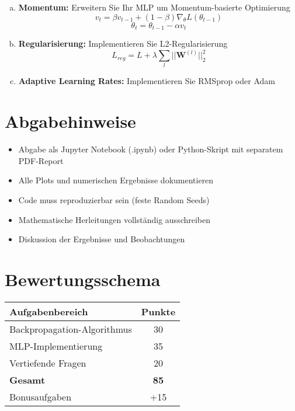 ﻿\documentclass[12pt,a4paper]{article}
\begin{document}
\begin{enumerate}[(a)]
    \item \textbf{Momentum:} Erweitern Sie Ihr MLP um Momentum-basierte Optimierung 
    \begin{equation}
    v_t = \beta v_{t-1} + (1-\beta) \nabla_\theta L(\theta_{t-1})
    \end{equation}
    \begin{equation}
    \theta_t = \theta_{t-1} - \alpha v_t
    \end{equation}
    
    \item \textbf{Regularisierung:} Implementieren Sie L2-Regularisierung 
    \begin{equation}
    L_{reg} = L + \lambda \sum_{l} ||\mathbf{W}^{(l)}||_2^2
    \end{equation}
    
    \item \textbf{Adaptive Learning Rates:} Implementieren Sie RMSprop oder Adam 
\end{enumerate}

\section*{Abgabehinweise}
\begin{itemize}
    \item Abgabe als Jupyter Notebook (.ipynb) oder Python-Skript mit separatem PDF-Report
    \item Alle Plots und numerischen Ergebnisse dokumentieren
    \item Code muss reproduzierbar sein (feste Random Seeds)
    \item Mathematische Herleitungen vollständig ausschreiben
    \item Diskussion der Ergebnisse und Beobachtungen
\end{itemize}

\section*{Bewertungsschema}
\begin{center}
\begin{tabular}{|l|c|}
\hline
\textbf{Aufgabenbereich} & \textbf{Punkte} \\
\hline
Backpropagation-Algorithmus & 30 \\
MLP-Implementierung & 35 \\
Vertiefende Fragen & 20 \\
\hline
\textbf{Gesamt} & \textbf{85} \\
\hline
Bonusaufgaben & +15 \\
\hline
\end{tabular}
\end{center}
\end{document}
